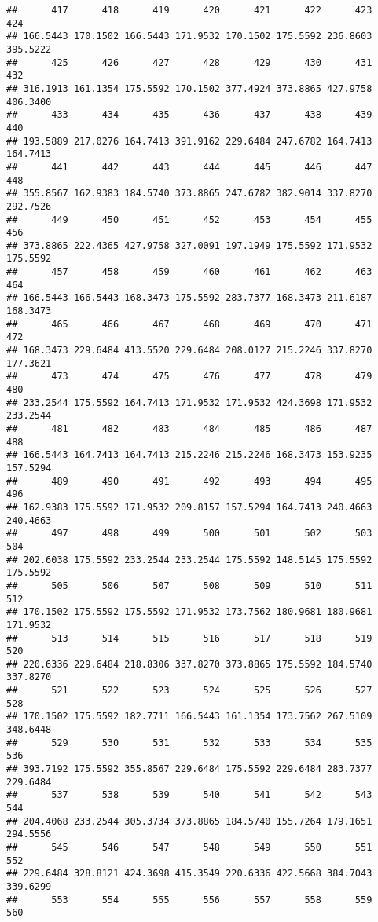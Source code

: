 \documentclass[
]{article}
\begin{document}
\begin{verbatim}
##      417      418      419      420      421      422      423      424 
## 166.5443 170.1502 166.5443 171.9532 170.1502 175.5592 236.8603 395.5222 
##      425      426      427      428      429      430      431      432 
## 316.1913 161.1354 175.5592 170.1502 377.4924 373.8865 427.9758 406.3400 
##      433      434      435      436      437      438      439      440 
## 193.5889 217.0276 164.7413 391.9162 229.6484 247.6782 164.7413 164.7413 
##      441      442      443      444      445      446      447      448 
## 355.8567 162.9383 184.5740 373.8865 247.6782 382.9014 337.8270 292.7526 
##      449      450      451      452      453      454      455      456 
## 373.8865 222.4365 427.9758 327.0091 197.1949 175.5592 171.9532 175.5592 
##      457      458      459      460      461      462      463      464 
## 166.5443 166.5443 168.3473 175.5592 283.7377 168.3473 211.6187 168.3473 
##      465      466      467      468      469      470      471      472 
## 168.3473 229.6484 413.5520 229.6484 208.0127 215.2246 337.8270 177.3621 
##      473      474      475      476      477      478      479      480 
## 233.2544 175.5592 164.7413 171.9532 171.9532 424.3698 171.9532 233.2544 
##      481      482      483      484      485      486      487      488 
## 166.5443 164.7413 164.7413 215.2246 215.2246 168.3473 153.9235 157.5294 
##      489      490      491      492      493      494      495      496 
## 162.9383 175.5592 171.9532 209.8157 157.5294 164.7413 240.4663 240.4663 
##      497      498      499      500      501      502      503      504 
## 202.6038 175.5592 233.2544 233.2544 175.5592 148.5145 175.5592 175.5592 
##      505      506      507      508      509      510      511      512 
## 170.1502 175.5592 175.5592 171.9532 173.7562 180.9681 180.9681 171.9532 
##      513      514      515      516      517      518      519      520 
## 220.6336 229.6484 218.8306 337.8270 373.8865 175.5592 184.5740 337.8270 
##      521      522      523      524      525      526      527      528 
## 170.1502 175.5592 182.7711 166.5443 161.1354 173.7562 267.5109 348.6448 
##      529      530      531      532      533      534      535      536 
## 393.7192 175.5592 355.8567 229.6484 175.5592 229.6484 283.7377 229.6484 
##      537      538      539      540      541      542      543      544 
## 204.4068 233.2544 305.3734 373.8865 184.5740 155.7264 179.1651 294.5556 
##      545      546      547      548      549      550      551      552 
## 229.6484 328.8121 424.3698 415.3549 220.6336 422.5668 384.7043 339.6299 
##      553      554      555      556      557      558      559      560 

\end{verbatim}
\end{document}
